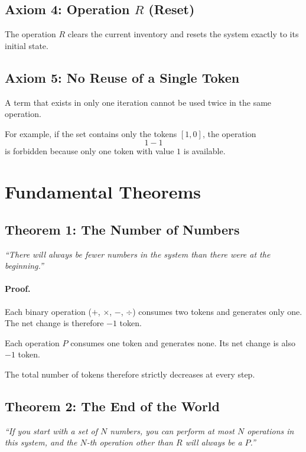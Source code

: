 \documentclass[12pt,a4paper]{article}
\begin{document}
\subsection{Axiom 4: Operation $R$ (Reset)}

The operation $R$ clears the current inventory and resets the system
exactly to its initial state.

\subsection{Axiom 5: No Reuse of a Single Token}

A term that exists in only one iteration cannot be used twice in
the same operation.

For example, if the set contains only the tokens $[1,0]$, the
operation
\[
1-1
\]
is forbidden because only one token with value $1$ is available.

\section{Fundamental Theorems}

\subsection{Theorem 1: The Number of Numbers}

\textit{``There will always be fewer numbers in the system than
there were at the beginning.''}

\paragraph{Proof.}
Each binary operation ($+$, $\times$, $-$, $\div$) consumes two
tokens and generates only one. The net change is therefore
$-1$ token.

Each operation $P$ consumes one token and generates none.
Its net change is also $-1$ token.

The total number of tokens therefore strictly decreases at every
step.

\subsection{Theorem 2: The End of the World}

\textit{``If you start with a set of $N$ numbers, you can perform
at most $N$ operations in this system, and the $N$-th operation
other than $R$ will always be a $P$.''}
\end{document}
